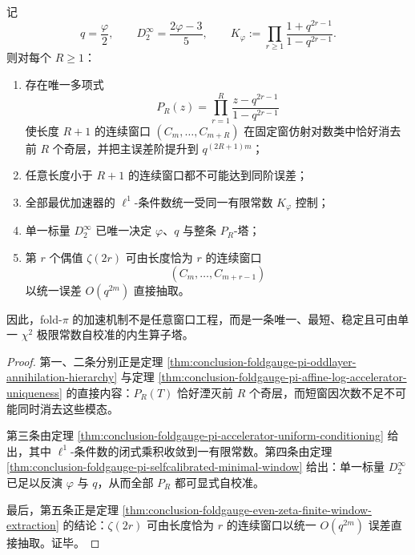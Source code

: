 \begin{theorem}\label{thm:conclusion-foldgauge-pi-selfcalibrated-accelerator-tower-uniqueness}
记
\[
q=\frac{\varphi}{2},
\qquad
D_2^\infty=\frac{2\varphi-3}{5},
\qquad
K_\varphi:=\prod_{r\ge 1}\frac{1+q^{2r-1}}{1-q^{2r-1}}.
\]
则对每个 \(R\ge 1\)：
\begin{enumerate}
  \item 存在唯一多项式
  \[
  P_R(z)=\prod_{r=1}^{R}\frac{z-q^{2r-1}}{1-q^{2r-1}}
  \]
  使长度 \(R+1\) 的连续窗口 \((C_m,\dots,C_{m+R})\) 在固定窗仿射对数类中恰好消去前 \(R\) 个奇层，并把主误差阶提升到 \(q^{(2R+1)m}\)；
  \item 任意长度小于 \(R+1\) 的连续窗口都不可能达到同阶误差；
  \item 全部最优加速器的 \(\ell^1\)-条件数统一受同一有限常数 \(K_\varphi\) 控制；
  \item 单一标量 \(D_2^\infty\) 已唯一决定 \(\varphi\)、\(q\) 与整条 \(P_R\)-塔；
  \item 第 \(r\) 个偶值 \(\zeta(2r)\) 可由长度恰为 \(r\) 的连续窗口
  \[
  (C_m,\dots,C_{m+r-1})
  \]
  以统一误差 \(O(q^{2m})\) 直接抽取。
\end{enumerate}
因此，fold-\(\pi\) 的加速机制不是任意窗口工程，而是一条唯一、最短、稳定且可由单一 \(\chi^2\) 极限常数自校准的内生算子塔。
\end{theorem}
\begin{proof}
第一、二条分别正是定理 \ref{thm:conclusion-foldgauge-pi-oddlayer-annihilation-hierarchy} 与定理 \ref{thm:conclusion-foldgauge-pi-affine-log-accelerator-uniqueness} 的直接内容：\(P_R(T)\) 恰好湮灭前 \(R\) 个奇层，而短窗因次数不足不可能同时消去这些模态。

第三条由定理 \ref{thm:conclusion-foldgauge-pi-accelerator-uniform-conditioning} 给出，其中 \(\ell^1\)-条件数的闭式乘积收敛到一有限常数。第四条由定理 \ref{thm:conclusion-foldgauge-pi-selfcalibrated-minimal-window} 给出：单一标量 \(D_2^\infty\) 已足以反演 \(\varphi\) 与 \(q\)，从而全部 \(P_R\) 都可显式自校准。

最后，第五条正是定理 \ref{thm:conclusion-foldgauge-even-zeta-finite-window-extraction} 的结论：\(\zeta(2r)\) 可由长度恰为 \(r\) 的连续窗口以统一 \(O(q^{2m})\) 误差直接抽取。证毕。
\end{proof}

